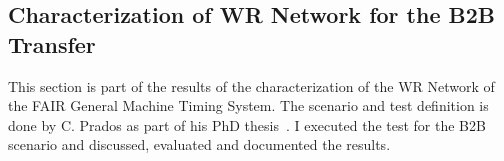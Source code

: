 %
%

\subsection{Characterization of WR Network for the B2B Transfer}
This section is part of the results of the characterization of the WR Network of the FAIR General Machine Timing System. The scenario and test definition is done by C. Prados as part of his PhD thesis~\cite{prados_notitle_nodate}. I executed the test for the B2B scenario and discussed, evaluated and documented the results. 

